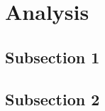 \chapter{Analysis}
\lipsum[3]
\cite{coplienAOSDObjects}

\section{Subsection 1}
\lipsum[8]
\cite{opensourceArch}

\section{Subsection 2}
\lipsum[6]
\lipsum[5]
\cite{generativeProg}